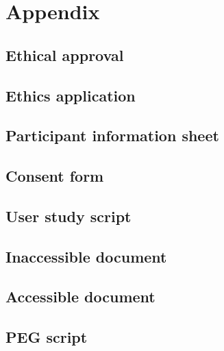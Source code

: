 \section{Appendix}
\subsection{\nmu Ethical \nmu approval}\label{appendix:ethics_approval}


\subsection{Ethics application}


\subsection{\nmu Participant \nmu information sheet}\label{appendix:pis}


\subsection{\nmu Consent \nmu form}\label{appendix:consent_form}


\subsection{\nmu User \nmu study script}\label{appendix:user_study_script}


\subsection{Inaccessible document}\label{appendix:inaccessible_doc}


\subsection{Accessible document}\label{appendix:accessible_doc}


\subsection{PEG script}\label{appendix:peg_script}


